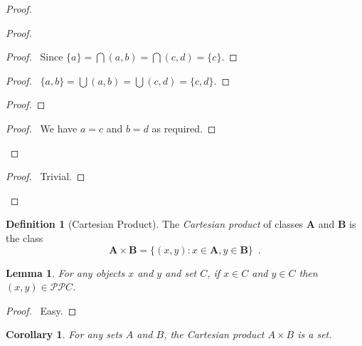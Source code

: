 \documentclass{article}
\let\qed\relax
\newtheorem{lemma}[axiom]{Lemma}
\newtheorem{corollary}{Corollary}[axiom]
\theoremstyle{definition}
\newtheorem{definition}[axiom]{Definition}
\begin{document}
    \begin{proof}
        \pf
        \begin{proof}
            \begin{proof}
                \pf\ Since $\{a\} = \bigcap (a,b) = \bigcap (c,d) = \{c\}$.
            \end{proof}
            \begin{proof}
                \pf\ $\{a,b\} = \bigcup (a,b) = \bigcup (c,d) = \{c,d\}$.
            \end{proof}
            \begin{proof}
            \end{proof}
            \begin{proof}
                \pf\ We have $a = c$ and $b = d$ as required.
            \end{proof}
        \end{proof}
        \begin{proof}
            \pf\ Trivial.
        \end{proof}
        \qed
    \end{proof}

    \begin{definition}[Cartesian Product]
        The \emph{Cartesian product} of classes $\mathbf{A}$ and $\mathbf{B}$ is the class
        \[ \mathbf{A} \times \mathbf{B} = \{ (x,y) : x \in \mathbf{A}, y \in \mathbf{B} \} \enspace . \]
    \end{definition}

    \begin{lemma}
        For any objects $x$ and $y$ and set $C$, if $x \in C$ and $y \in C$ then $(x,y) \in \mathcal{PP} C$.
    \end{lemma}

    \begin{proof}
        \pf\ Easy. \qed
    \end{proof}

    \begin{corollary}
        For any sets $A$ and $B$, the Cartesian product $A \times B$ is a set.
    \end{corollary}
\end{document}
